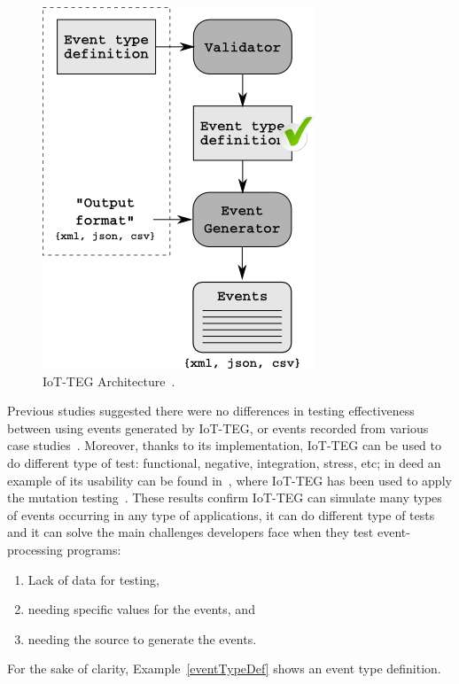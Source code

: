 \documentclass[review]{elsarticle}
\begin{document}
\begin{figure}[!ht]
	\centering
	\includegraphics[scale=0.7]{Images/IoT-EGArquitecture}
	\caption[IoT-TEG Architecture]{IoT-TEG Architecture~\cite{TesisGutierrez2017,Gutierrez2017}.}
	\label{fig:IoT-EGArquitecture}
\end{figure}

Previous studies suggested there were no differences in testing effectiveness between using events
generated by IoT-TEG, or events recorded from various case studies~\cite{TesisGutierrez2017,Gutierrez2017}.
Moreover, thanks to its implementation, IoT-TEG can be used to do different type of test: functional,
negative, integration, stress, etc; in deed an example of its usability can be found 
in~\cite{TesisGutierrez2017,gutierrez2018}, where IoT-TEG has been used to apply the mutation 
testing~\cite{jia2011}. These results confirm IoT-TEG can 
simulate many types of events occurring in any type of applications, it can do different type of tests
and it can solve the main challenges developers face when they test event-processing programs:
\begin{enumerate}
	\item Lack of data for testing,
	\item needing specific values for the events, and
	\item needing the source to generate the events.
\end{enumerate}

For the sake of clarity, Example~\ref{eventTypeDef} shows an event type
definition.
\end{document}

